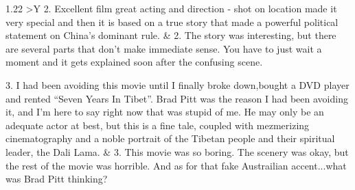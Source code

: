 \documentclass[runningheads,a4paper]{llncs}
\begin{document}
\begin{table}[h!]
{\begin{tabularx}{1.22\textwidth}{ >{\hsize}Y }
2. Excellent film great acting and direction - shot on location made it very special and then it is based on a true story that made a powerful political statement on China's dominant rule. & 2.  The  story   was   interesting,   but   there   are   several   parts that  don't  make  immediate  sense.  You  have  to  just  wait  a moment  and it gets explained  soon  after  the  confusing  scene. \\
 \midrule

3. I had been avoiding this movie until I finally broke down,bought a DVD player and rented ``Seven Years In Tibet''. Brad Pitt  was  the  reason  I had  been  avoiding  it, and  I'm here to say right now that  was stupid of me. He may only be an adequate actor at best, but this is a fine tale, coupled with  mezmerizing  cinematography and a noble portrait  of the Tibetan people and their spiritual leader, the Dali Lama. & 3.   This   movie   was   so   boring.   The   scenery   was   okay, but  the   rest   of  the   movie  was  horrible.   And  as  for  that fake    Austrailian    accent...what    was    Brad    Pitt    thinking? \\
 \bottomrule

\end{tabularx}}

\label{}
\end{table}
\end{document}
